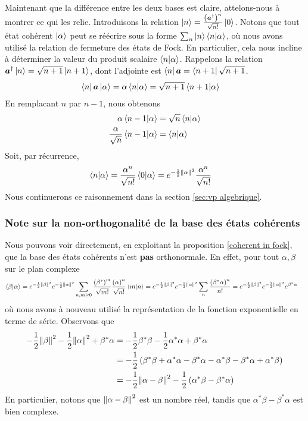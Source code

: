 \documentclass[11pt,oneside,a4paper]{article}
\begin{document}
Maintenant que la différence entre les deux bases est claire, attelons-nous à montrer ce qui les relie. Introduisons la relation $\ket{n} = \frac{\left(\bm{a}^\dagger\right)^n}{\sqrt{n!}}\ket{0}$. Notons que tout état cohérent $\ket{\alpha}$ peut se réécrire sous la forme $\sum_n \ket{n}\braket{n}{\alpha}$, où nous avons utilisé la relation de fermeture des états de Fock. En particulier, cela nous incline à déterminer la valeur du produit scalaire $\braket{n}{\alpha}$. Rappelons la relation $\bm{a}^\dagger\ket{n} = \sqrt{n+1}\ket{n+1}$, dont l'adjointe est $\bra{n}\bm{a} = \bra{n+1}\sqrt{n+1}$.
\begin{align}
  \bra{n}\bm{a}\ket{\alpha} = \alpha\braket{n}{\alpha} &= \sqrt{n+1}\braket{n+1}{\alpha}\notag
\end{align}
En remplacant $n$ par $n-1$, nous obtenons
\begin{align}
  \alpha\braket{n-1}{\alpha} &= \sqrt{n}\braket{n}{\alpha}\notag\\
  \frac{\alpha}{\sqrt{n}}\braket{n-1}{\alpha} &= \braket{n}{\alpha}\notag
\end{align}
Soit, par récurrence, 
\begin{align}
  \braket{n}{\alpha} &= \frac{\alpha^n}{\sqrt{n!}}\braket{0}{\alpha} = e^{-\frac{1}{2}\norm{\alpha}^2}\frac{\alpha^n}{\sqrt{n!}}\label{eq:scalar fock vs coherent}
\end{align}
Nous continuerons ce raisonnement dans la section \ref{sec:vp algebrique}.
\subsubsection{Note sur la non-orthogonalité de la base des états cohérents}
Nous pouvons voir directement, en exploitant la proposition \ref{coherent in fock}, que la base des états cohérents n'est \textbf{pas} orthonormale. En effet, pour tout $\alpha,\beta$ sur le plan complexe
\begin{align}
  \braket{\beta}{\alpha} &= e^{-\frac{1}{2}\norm{\beta}^2}e^{-\frac{1}{2}\norm{\alpha}^2}\sum_{n,m\geq 0}\frac{\left(\beta^*\right)^m}{\sqrt{m!}}\frac{\left(\alpha\right)^n}{\sqrt{n!}}\braket{m}{n}
  = e^{-\frac{1}{2}\norm{\beta}^2}e^{-\frac{1}{2}\norm{\alpha}^2} \sum_n \frac{\left(\beta^*\alpha\right)^n}{n!} = e^{-\frac{1}{2}\norm{\beta}^2}e^{-\frac{1}{2}\norm{\alpha}^2}e^{\beta^*\alpha}\label{15}
\end{align}
où nous avons à nouveau utilisé la représentation de la fonction exponentielle en terme de série. Observons que 
\begin{align*}
  -\frac{1}{2}\norm{\beta}^2-\frac{1}{2}\norm{\alpha}^2+\beta^*\alpha &= -\frac{1}{2}\beta^*\beta - \frac{1}{2}\alpha^*\alpha+\beta^*\alpha\\
  &= -\frac{1}{2}\left(\beta^*\beta+\alpha^*\alpha-\beta^*\alpha-\alpha^*\beta-\beta^*\alpha+\alpha^*\beta\right)\\
  &= -\frac{1}{2}\norm{\alpha-\beta}^2-\frac{1}{2}\left(\alpha^*\beta-\beta^*\alpha\right)
\end{align*}
En particulier, notons que $\norm{\alpha-\beta}^2$ est un nombre réel, tandis que $\alpha^*\beta-\beta^*\alpha$ est bien complexe. 
\end{document}
